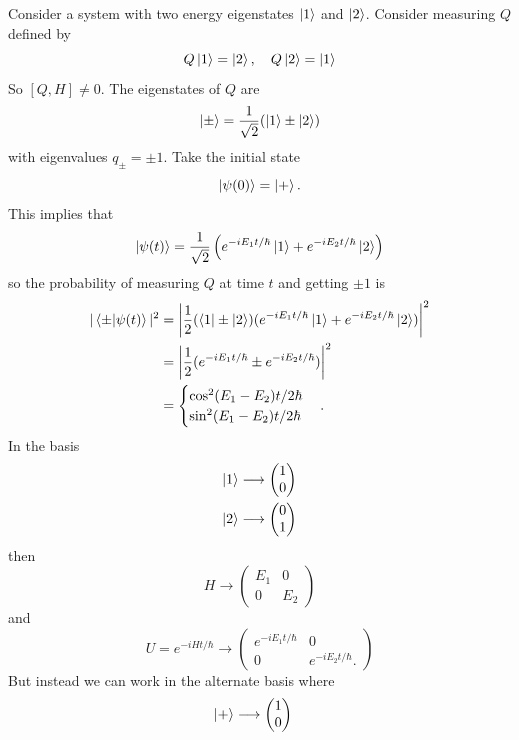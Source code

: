 \documentclass{article}
\begin{document}
\begin{example}
  Consider a system with two energy eigenstates $ \ket 1 $ and $ \ket 2 $. Consider measuring $ Q $ defined by
  \[
    Q\ket 1 = \ket 2, \quad Q\ket 2 = \ket 1
  \]
  So $ [Q,H]\ne 0 $. The eigenstates of $ Q $ are
  \[
	  \ket \pm = \frac 1{\sqrt 2}(\ket 1 \pm \ket 2)
  \]
  with eigenvalues $ q_\pm = \pm 1 $. Take the initial state
  \[
	  \ket {\psi(0)} = \ket +.
  \]
  This implies that
  \[
	  \ket{\psi(t)} = \frac 1{\sqrt 2}\left(e^{-iE_1t/\hbar}\ket 1 + e^{-iE_2t/\hbar}\ket 2\right)
  \]
  so the probability of measuring $ Q $ at time $ t $ and getting $ \pm 1 $ is
  \begin{align*}
	  |\bra{\pm}\ket{\psi(t)}|^2 &= \left|\frac 12 (\bra{1}\pm\ket{2})(e^{-iE_1t/\hbar}\ket{1}+e^{-iE_2t/\hbar} \ket 2)\right|^2 \\
				     &= \left|\frac 12(e^{-iE_1t/\hbar}\pm e^{-iE_2t/\hbar})\right|^2 \\
				     &= \begin{cases}
					     \cos^2(E_1-E_2)t/2\hbar \\
					     \sin^2(E_1-E_2)t/2\hbar
				     \end{cases}. \\
  \end{align*}
  In the basis 
  \begin{align*}
	  \ket  1 &\longrightarrow \begin{pmatrix}
      1 \\ 0
    \end{pmatrix} \\
		  \ket 2 &\longrightarrow \begin{pmatrix}
		    0 \\ 1
		  \end{pmatrix}
  \end{align*}
  then
  \[
    H\longrightarrow \begin{pmatrix}
       E_1 & 0 \\
       0 & E_2
    \end{pmatrix}
  \]
  and
  \[
	  U= e^{-iHt/\hbar} \longrightarrow \begin{pmatrix}
	     e^{-iE_1t/\hbar} & 0 \\
	     0 & e^{-iE_2t/\hbar}.
	  \end{pmatrix}
  \]
  But instead we can work in the alternate basis where
  \begin{align*}
	  \ket + &\longrightarrow \begin{pmatrix}
	    1 \\ 0

\end{pmatrix}
\end{align*}
\end{example}
\end{document}
